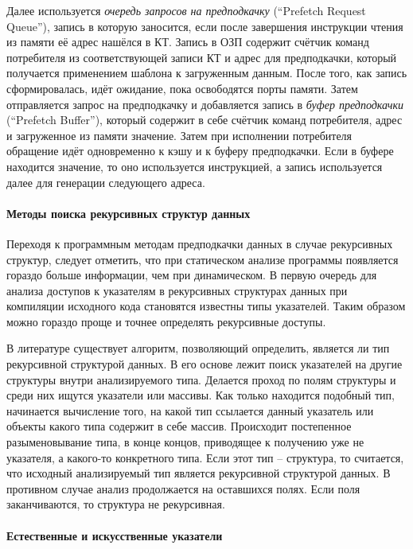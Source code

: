 \documentclass[12pt,a4paper]{article}
\begin{document}
Далее используется \emph{очередь запросов на предподкачку} (``Prefetch Request Queue''), запись в которую заносится, если после завершения инструкции чтения из памяти её адрес нашёлся в КТ. Запись в ОЗП содержит счётчик команд потребителя из соответствующей записи КТ и адрес для предподкачки, который получается применением шаблона к загруженным данным. После того, как запись сформировалась, идёт ожидание, пока освободятся порты памяти. Затем отправляется запрос на предподкачку и добавляется запись в \emph{буфер предподкачки} (``Prefetch Buffer''), который содержит в себе счётчик команд потребителя, адрес и загруженное из памяти значение. Затем при исполнении потребителя обращение идёт одновременно к кэшу и к буферу предподкачки. Если в буфере находится значение, то оно используется инструкцией, а запись используется далее для генерации следующего адреса.

\paragraph{Методы поиска рекурсивных структур данных}

Переходя к программным методам предподкачки данных в случае рекурсивных структур, следует отметить, что при статическом анализе программы появляется гораздо больше информации, чем при динамическом. В первую очередь для анализа доступов к указателям в рекурсивных структурах данных при компиляции исходного кода становятся известны типы указателей. Таким образом можно гораздо проще и точнее определять рекурсивные доступы.

В литературе существует алгоритм, позволяющий определить, является ли тип рекурсивной структурой данных. В его основе лежит поиск указателей на другие структуры внутри анализируемого типа. Делается проход по полям структуры и среди них ищутся указатели или массивы. Как только находится подобный тип, начинается вычисление того, на какой тип ссылается данный указатель или объекты какого типа содержит в себе массив. Происходит постепенное разыменовывание типа, в конце концов, приводящее к получению уже не указателя, а какого-то конкретного типа. Если этот тип -- структура, то считается, что исходный анализируемый тип является рекурсивной структурой данных. В противном случае анализ продолжается на оставшихся полях. Если поля заканчиваются, то структура не рекурсивная.

\paragraph{Естественные и искусственные указатели}
\end{document}
